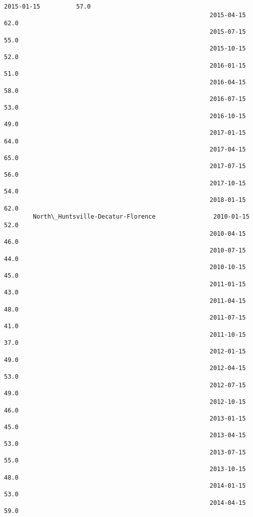 \documentclass[11pt]{article}
\begin{document}
\begin{Verbatim}[commandchars=\\\{\}]
                                                         2015-01-15          57.0   
                                                         2015-04-15          62.0   
                                                         2015-07-15          55.0   
                                                         2015-10-15          52.0   
                                                         2016-01-15          51.0   
                                                         2016-04-15          58.0   
                                                         2016-07-15          53.0   
                                                         2016-10-15          49.0   
                                                         2017-01-15          64.0   
                                                         2017-04-15          65.0   
                                                         2017-07-15          56.0   
                                                         2017-10-15          54.0   
                                                         2018-01-15          62.0   
        North\_Huntsville-Decatur-Florence                2010-01-15          52.0   
                                                         2010-04-15          46.0   
                                                         2010-07-15          44.0   
                                                         2010-10-15          45.0   
                                                         2011-01-15          43.0   
                                                         2011-04-15          48.0   
                                                         2011-07-15          41.0   
                                                         2011-10-15          37.0   
                                                         2012-01-15          49.0   
                                                         2012-04-15          53.0   
                                                         2012-07-15          49.0   
                                                         2012-10-15          46.0   
                                                         2013-01-15          45.0   
                                                         2013-04-15          53.0   
                                                         2013-07-15          55.0   
                                                         2013-10-15          48.0   
                                                         2014-01-15          53.0   
                                                         2014-04-15          59.0   

\end{Verbatim}
\end{document}
